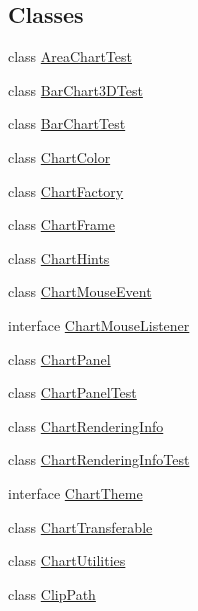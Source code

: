 \subsection*{Classes}
\begin{DoxyCompactItemize}
\item 
class \mbox{\hyperlink{classorg_1_1jfree_1_1chart_1_1_area_chart_test}{Area\+Chart\+Test}}
\item 
class \mbox{\hyperlink{classorg_1_1jfree_1_1chart_1_1_bar_chart3_d_test}{Bar\+Chart3\+D\+Test}}
\item 
class \mbox{\hyperlink{classorg_1_1jfree_1_1chart_1_1_bar_chart_test}{Bar\+Chart\+Test}}
\item 
class \mbox{\hyperlink{classorg_1_1jfree_1_1chart_1_1_chart_color}{Chart\+Color}}
\item 
class \mbox{\hyperlink{classorg_1_1jfree_1_1chart_1_1_chart_factory}{Chart\+Factory}}
\item 
class \mbox{\hyperlink{classorg_1_1jfree_1_1chart_1_1_chart_frame}{Chart\+Frame}}
\item 
class \mbox{\hyperlink{classorg_1_1jfree_1_1chart_1_1_chart_hints}{Chart\+Hints}}
\item 
class \mbox{\hyperlink{classorg_1_1jfree_1_1chart_1_1_chart_mouse_event}{Chart\+Mouse\+Event}}
\item 
interface \mbox{\hyperlink{interfaceorg_1_1jfree_1_1chart_1_1_chart_mouse_listener}{Chart\+Mouse\+Listener}}
\item 
class \mbox{\hyperlink{classorg_1_1jfree_1_1chart_1_1_chart_panel}{Chart\+Panel}}
\item 
class \mbox{\hyperlink{classorg_1_1jfree_1_1chart_1_1_chart_panel_test}{Chart\+Panel\+Test}}
\item 
class \mbox{\hyperlink{classorg_1_1jfree_1_1chart_1_1_chart_rendering_info}{Chart\+Rendering\+Info}}
\item 
class \mbox{\hyperlink{classorg_1_1jfree_1_1chart_1_1_chart_rendering_info_test}{Chart\+Rendering\+Info\+Test}}
\item 
interface \mbox{\hyperlink{interfaceorg_1_1jfree_1_1chart_1_1_chart_theme}{Chart\+Theme}}
\item 
class \mbox{\hyperlink{classorg_1_1jfree_1_1chart_1_1_chart_transferable}{Chart\+Transferable}}
\item 
class \mbox{\hyperlink{classorg_1_1jfree_1_1chart_1_1_chart_utilities}{Chart\+Utilities}}
\item 
class \mbox{\hyperlink{classorg_1_1jfree_1_1chart_1_1_clip_path}{Clip\+Path}}

\end{DoxyCompactItemize}
